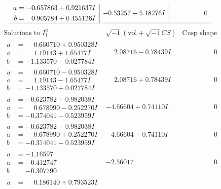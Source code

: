 \documentclass[1p]{elsarticle_modified}
\theoremstyle{definition}
\newcommand{\I}{\sqrt{-1}}
\begin{document}
$$\begin{array}{c|c|c}
\begin{aligned}
a &= -0.657863 + 0.921637 I \\
b &= \phantom{-}0.905784 + 0.455126 I\end{aligned}
 & -0.53257 + 5.18276 I & \phantom{-0.000000 } 0\\
 \hline 
 \end{array}$$\newpage$$\begin{array}{c|c|c}  
\text{Solutions to }I^u_{1}& \I (\text{vol} + \sqrt{-1}CS) & \text{Cusp shape}\\
 \hline 
\begin{aligned}
u &= \phantom{-}0.660710 + 0.950328 I \\
a &= \phantom{-}1.19143 + 1.65477 I \\
b &= -1.133570 - 0.027784 I\end{aligned}
 & \phantom{-}2.08716 - 0.78439 I & \phantom{-0.000000 } 0 \\ \hline\begin{aligned}
u &= \phantom{-}0.660710 - 0.950328 I \\
a &= \phantom{-}1.19143 - 1.65477 I \\
b &= -1.133570 + 0.027784 I\end{aligned}
 & \phantom{-}2.08716 + 0.78439 I & \phantom{-0.000000 } 0 \\ \hline\begin{aligned}
u &= -0.623782 + 0.982038 I \\
a &= \phantom{-}0.678990 - 0.252270 I \\
b &= -0.374041 - 0.523959 I\end{aligned}
 & -4.66604 + 0.74110 I & \phantom{-0.000000 } 0 \\ \hline\begin{aligned}
u &= -0.623782 - 0.982038 I \\
a &= \phantom{-}0.678990 + 0.252270 I \\
b &= -0.374041 + 0.523959 I\end{aligned}
 & -4.66604 - 0.74110 I & \phantom{-0.000000 } 0 \\ \hline\begin{aligned}
u &= -1.16597\phantom{ +0.000000I} \\
a &= -0.412747\phantom{ +0.000000I} \\
b &= -0.307790\phantom{ +0.000000I}\end{aligned}
 & -2.56017\phantom{ +0.000000I} & \phantom{-0.000000 } 0 \\ \hline\begin{aligned}
u &= \phantom{-}0.186140 + 0.793523 I \\

\end{aligned}
\end{array}$$
\end{document}
